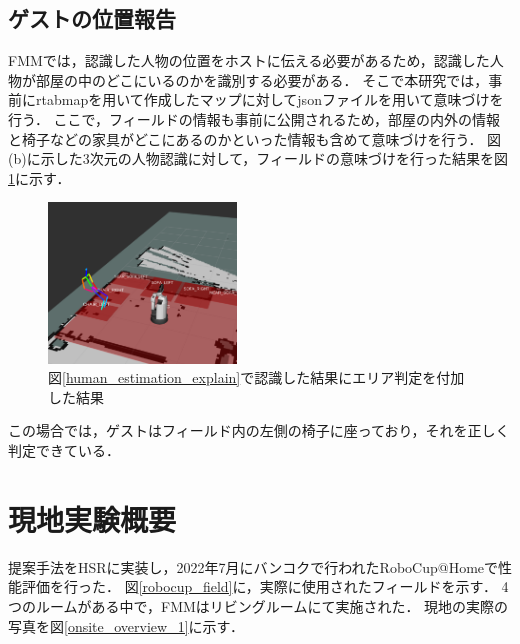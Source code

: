 \documentclass[a4j]{jarticle}
\begin{document}
\subsection{ゲストの位置報告}
FMMでは，認識した人物の位置をホストに伝える必要があるため，認識した人物が部屋の中のどこにいるのかを識別する必要がある．
そこで本研究では，事前にrtabmap\cite{rtabmap}を用いて作成したマップに対してjsonファイルを用いて意味づけを行う．
ここで，フィールドの情報も事前に公開されるため，部屋の内外の情報と椅子などの家具がどこにあるのかといった情報も含めて意味づけを行う．
図\label{human_estimation_explain} (b)に示した3次元の人物認識に対して，フィールドの意味づけを行った結果を図\ref{human_where_map}に示す．
\begin{figure}[ht]
  \centering
  \includegraphics[width=5cm]{images/human_recognition/ss_5_trim.png}
  \caption{図\ref{human_estimation_explain}で認識した結果にエリア判定を付加した結果}
  \label{human_where_map}
\end{figure}
この場合では，ゲストはフィールド内の左側の椅子に座っており，それを正しく判定できている．


\section{現地実験概要}
提案手法をHSRに実装し，2022年7月にバンコクで行われたRoboCup@Homeで性能評価を行った．
図\ref{robocup_field}に，実際に使用されたフィールドを示す．
4つのルームがある中で，FMMはリビングルームにて実施された．
現地の実際の写真を図\ref{onsite_overview_1}に示す．
\end{document}
